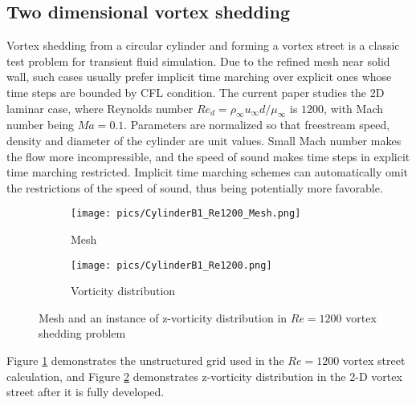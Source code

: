 \subsection{Two dimensional vortex shedding}

Vortex shedding from a circular cylinder and forming a vortex street
is a classic test problem for transient fluid simulation. Due to the refined
mesh near solid wall, such cases usually prefer implicit time marching
over explicit ones whose time steps are bounded by CFL condition.
The current paper studies the 2D laminar case, where
Reynolds number
$Re_d=\rho_\infty u_\infty d / \mu_\infty $ is  $1200$,
with Mach number being $Ma=0.1$.
Parameters are normalized so that freestream speed, density
and diameter of the cylinder are unit values.
Small Mach number makes the flow more incompressible, and
the speed of sound makes time steps in explicit time marching
restricted.
Implicit time marching schemes can automatically omit the restrictions
of the speed of sound, thus being potentially more favorable.

\begin{figure}[htbp]
    \centering
    \begin{subfigure}{0.5\textwidth}
        \texttt{[image: pics/CylinderB1\_Re1200\_Mesh.png]}
        \caption[]{Mesh}
        \label{sfig:CylinderRe1200Demo_Mesh}
    \end{subfigure}\hfill
    \begin{subfigure}{0.5\textwidth}
        \texttt{[image: pics/CylinderB1\_Re1200.png]}
        \caption[]{Vorticity distribution}
        \label{sfig:CylinderRe1200Demo_Vort}
    \end{subfigure}
    \caption[]{Mesh and an instance of z-vorticity distribution
        in $Re=1200$ vortex shedding problem}
    \label{fig:CylinderRe1200Demo}
\end{figure}

Figure \ref{sfig:CylinderRe1200Demo_Mesh} demonstrates
the unstructured grid used in the $Re=1200$  vortex
street calculation, and Figure \ref{sfig:CylinderRe1200Demo_Vort}
demonstrates z-vorticity distribution in the 2-D vortex street
after it is fully developed.

